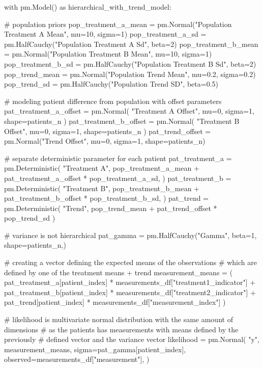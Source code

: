 \documentclass[12pt,a4paper,leqno]{report}
\theoremstyle{plain}
\theoremstyle{definition}
\theoremstyle{remark}
\begin{document}
\bigskip
\begin{pyverbatim}[][fontsize=\footnotesize]
with pm.Model() as hierarchical_with_trend_model:

    # population priors
    pop_treatment_a_mean = pm.Normal("Population Treatment A Mean", mu=10, sigma=1)
    pop_treatment_a_sd = pm.HalfCauchy("Population Treatment A Sd", beta=2)
    pop_treatment_b_mean = pm.Normal("Population Treatment B Mean", mu=10, sigma=1)
    pop_treatment_b_sd = pm.HalfCauchy("Population Treatment B Sd", beta=2)
    pop_trend_mean = pm.Normal("Population Trend Mean", mu=0.2, sigma=0.2)
    pop_trend_sd = pm.HalfCauchy("Population Trend SD", beta=0.5)

    # modeling patient difference from population with offset parameters
    pat_treatment_a_offset = pm.Normal(
        "Treatment A Offset", mu=0, sigma=1, shape=patients_n
    )
    pat_treatment_b_offset = pm.Normal(
        "Treatment B Offset", mu=0, sigma=1, shape=patients_n
    )
    pat_trend_offset = pm.Normal("Trend Offset", mu=0, sigma=1, shape=patients_n)

    # separate deterministic parameter for each patient
    pat_treatment_a = pm.Deterministic(
        "Treatment A",
        pop_treatment_a_mean + pat_treatment_a_offset * pop_treatment_a_sd,
    )
    pat_treatment_b = pm.Deterministic(
        "Treatment B",
        pop_treatment_b_mean + pat_treatment_b_offset * pop_treatment_b_sd,
    )
    pat_trend = pm.Deterministic(
        "Trend", pop_trend_mean + pat_trend_offset * pop_trend_sd
    )

    # variance is not hierarchical
    pat_gamma = pm.HalfCauchy("Gamma", beta=1, shape=patients_n,)

    # creating a vector defining the expected means of the observations
    # which are defined by one of the treatment means + trend
    measurement_means = (
        pat_treatment_a[patient_index] * measurements_df["treatment1_indicator"]
        + pat_treatment_b[patient_index] * measurements_df["treatment2_indicator"]
        + pat_trend[patient_index] * measurements_df["measurement_index"]
    )

    # likelihood is multivariate normal distribution with the same amount of dimensions
    # as the patients has measurements with means defined by the previously
    # defined vector and the variance vector
    likelihood = pm.Normal(
        "y",
        measurement_means,
        sigma=pat_gamma[patient_index],
        observed=measurements_df["measurement"],
    )


\end{pyverbatim}
\end{document}
